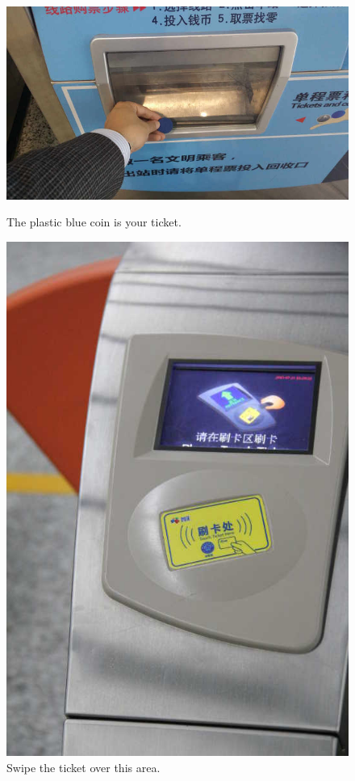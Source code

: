 \documentclass[11pt]{article}
\begin{document}
  \begin{figure}[!h]
	\begin{minipage}[t]{.5\textwidth}
     	\centering
        	\includegraphics[scale=0.27]{20150331_110738.jpg}
		\caption{The plastic blue coin is your ticket. \label{20150331_110738}}
	\end{minipage}%
     \begin{minipage}[t]{.5\textwidth}
         \centering
       	 \includegraphics[scale=0.27]{IMG_7177.jpg}
	 	 \caption{Swipe the ticket over this area. \label{IMG_7177}}
    \end{minipage}%
 \end{figure}
\end{document}
